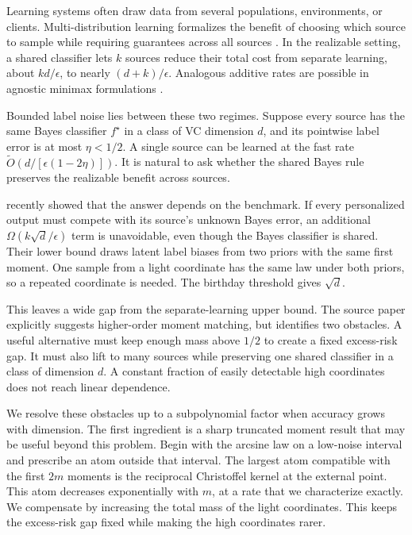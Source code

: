 \documentclass[twoside]{article}
\newcommand{\1}{\mathbf 1}
\begin{document}
Learning systems often draw data from several populations, environments, or clients. Multi-distribution learning formalizes the benefit of choosing which source to sample while requiring guarantees across all sources \citep{blum2017collaborative,haghtalab2022ondemand}. In the realizable setting, a shared classifier lets $k$ sources reduce their total cost from separate learning, about $kd/\epsilon$, to nearly $(d+k)/\epsilon$. Analogous additive rates are possible in agnostic minimax formulations \citep{zhang2024optimal,peng2024sample}.

Bounded label noise lies between these two regimes. Suppose every source has the same Bayes classifier $f^\star$ in a class of VC dimension $d$, and its pointwise label error is at most $\eta<1/2$. A single source can be learned at the fast rate $\widetilde O(d/[\epsilon(1-2\eta)])$. It is natural to ask whether the shared Bayes rule preserves the realizable benefit across sources.

\citet{hanashiro2026bounded} recently showed that the answer depends on the benchmark. If every personalized output must compete with its source's unknown Bayes error, an additional $\Omega(k\sqrt d/\epsilon)$ term is unavoidable, even though the Bayes classifier is shared. Their lower bound draws latent label biases from two priors with the same first moment. One sample from a light coordinate has the same law under both priors, so a repeated coordinate is needed. The birthday threshold gives $\sqrt d$.

This leaves a wide gap from the separate-learning upper bound. The source paper explicitly suggests higher-order moment matching, but identifies two obstacles. A useful alternative must keep enough mass above $1/2$ to create a fixed excess-risk gap. It must also lift to many sources while preserving one shared classifier in a class of dimension $d$. A constant fraction of easily detectable high coordinates does not reach linear dependence.

We resolve these obstacles up to a subpolynomial factor when accuracy grows with dimension. The first ingredient is a sharp truncated moment result that may be useful beyond this problem. Begin with the arcsine law on a low-noise interval and prescribe an atom outside that interval. The largest atom compatible with the first $2m$ moments is the reciprocal Christoffel kernel at the external point. This atom decreases exponentially with $m$, at a rate that we characterize exactly. We compensate by increasing the total mass of the light coordinates. This keeps the excess-risk gap fixed while making the high coordinates rarer.
\end{document}
